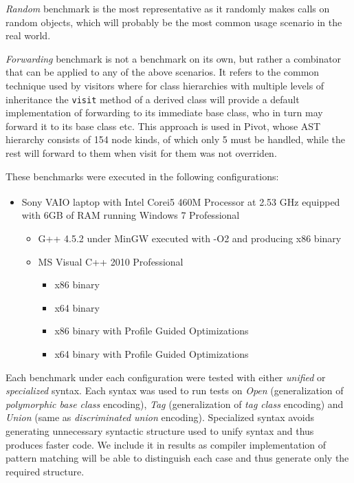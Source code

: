 \documentclass[preprint]{sigplanconf}
\makeatletter
\DeclareRobustCommand{\code}[1]{{\lstinline[breaklines=false,escapechar=@]{#1}}}
\makeatother
\begin{document}
\emph{Random} benchmark is the most representative as it randomly makes calls on 
random objects, which will probably be the most common usage scenario in the 
real world.

\emph{Forwarding} benchmark is not a benchmark on its own, but rather a 
combinator that can be applied to any of the above scenarios. It refers to the 
common technique used by visitors where for class hierarchies with multiple 
levels of inheritance the \code{visit} method of a derived class will provide a 
default implementation of forwarding to its immediate base class, who in turn 
may forward it to its base class etc. This approach is used in Pivot, whose AST 
hierarchy consists of 154 node kinds, of which only 5 must be handled, while the 
rest will forward to them when visit for them was not overriden.

These benchmarks were executed in the following configurations:

\begin{itemize}
\setlength{\itemsep}{0pt}
\setlength{\parskip}{0pt}
\item Sony VAIO\textsuperscript{\textregistered} laptop with Intel\textsuperscript{\textregistered} Core\texttrademark i5 460M 
      Processor at 2.53 GHz equipped with 6GB of RAM running Windows 7 
      Professional
      \begin{itemize}
      \setlength{\itemsep}{0pt}
      \setlength{\parskip}{0pt}
      \item G++ 4.5.2 under MinGW executed with -O2 and producing x86 binary
      \item MS Visual C++ 2010 Professional
            \begin{itemize}
            \setlength{\itemsep}{0pt}
            \setlength{\parskip}{0pt}
            \item x86 binary
            \item x64 binary
            \item x86 binary with Profile Guided Optimizations
            \item x64 binary with Profile Guided Optimizations
            \end{itemize}
      \end{itemize}
\end{itemize}

Each benchmark under each configuration were tested with either \emph{unified} 
or \emph{specialized} syntax. Each syntax was used to run tests on \emph{Open} 
(generalization of \emph{polymorphic base class} encoding), \emph{Tag} 
(generalization of \emph{tag class} encoding) and \emph{Union} (same as 
\emph{discriminated union} encoding). Specialized syntax avoids generating 
unnecessary syntactic structure used to unify syntax and thus produces faster 
code. We include it in results as compiler implementation of pattern matching 
will be able to distinguish each case and thus generate only the required 
structure.
\end{document}

